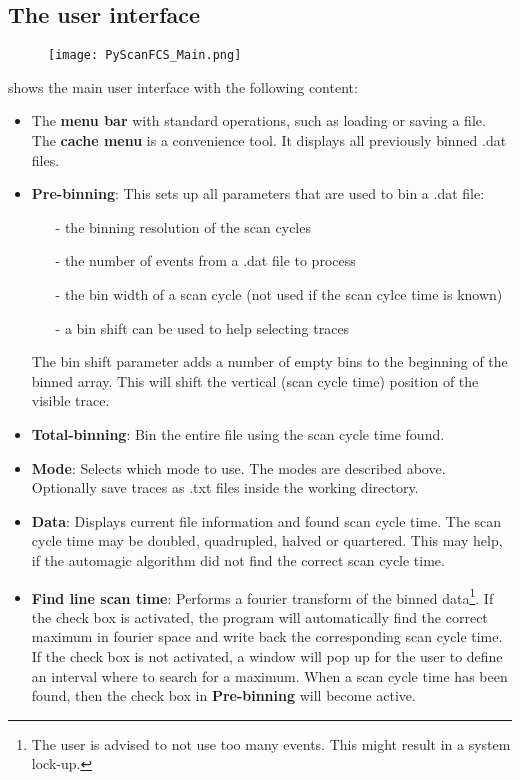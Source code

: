 \subsection{The user interface}
\begin{figure}[h]
\centering
\texttt{[image: PyScanFCS\_Main.png]}
\end{figure}
 shows the main user interface with the following content:
\begin{itemize}
\item The \textbf{menu bar} with standard operations, such as loading or saving a file. The \textbf{cache menu} is a convenience tool. It displays all previously binned \mytilde .dat files.

\item \textbf{Pre-binning}: This sets up all parameters that are used to bin a \mytilde .dat file:
	\begin{itemize}
	\item[-] the binning resolution of the scan cycles
	\item[-] the number of events from a \mytilde .dat file to process
	\item[-] the bin width of a scan cycle (not used if the scan cylce time is known)
	\item[-] a bin shift can be used to help selecting traces
	\end{itemize}
The bin shift parameter adds a number of empty bins to the beginning of the binned array. This will shift the vertical (scan cycle time) position of the visible trace.

\item \textbf{Total-binning}: Bin the entire file using the scan cycle time found.

\item \textbf{Mode}: Selects which mode to use. The modes are described above. Optionally save traces as \mytilde .txt files inside the working directory.

\item \textbf{Data}: Displays current file information and found scan cycle time. The scan cycle time may be doubled, quadrupled, halved or quartered. This may help, if the automagic algorithm did not find the correct scan cycle time.

\item  \textbf{Find line scan time}: Performs a fourier transform of the binned data\footnote{The user is advised to not use too many events. This might result in a system lock-up.}. If the check box is activated, the program will automatically find the correct maximum in fourier space and write back the corresponding scan cycle time. If the check box is not activated, a window will pop up for the user to define an interval where to search for a maximum. When a scan cycle time has been found, then the check box in \textbf{Pre-binning} will become active.


\end{itemize}
